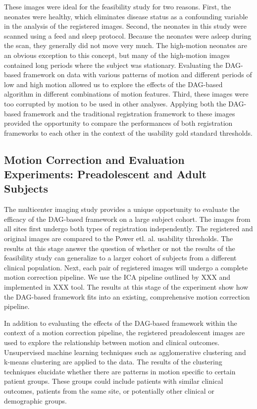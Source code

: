 These images were ideal for the feasibility study for two reasons. First, the neonates were healthy, which eliminates disease status as a confounding variable in the analysis of the registered images. Second, the neonates in this study were scanned using a feed and sleep protocol. Because the neonates were asleep during the scan, they generally did not move very much. The high-motion neonates are an obvious exception to this concept, but many of the high-motion images contained long periods where the subject was stationary. Evaluating the DAG-based framework on data with various patterns of motion and different periods of low and high motion allowed us to explore the effects of the DAG-based algorithm in different combinations of motion features. Third, these images were too corrupted by motion to be used in other analyses. Applying both the DAG-based framework and the traditional registration framework to these images provided the opportunity to compare the performances of both registration frameworks to each other in the context of the usability gold standard thresholds. 

\subsection{Motion Correction and Evaluation Experiments: Preadolescent and Adult Subjects}

The multicenter imaging study provides a unique opportunity to evaluate the efficacy of the DAG-based framework on a large subject cohort. The images from all sites first undergo both types of registration independently. The registered and original images are compared to the Power etl. al. usability thresholds. The results at this stage answer the question of whether or not the results of the feasibility study can generalize to a larger cohort of subjects from a different clinical population. Next, each pair of registered images will undergo a complete motion correction pipeline. We use the ICA pipeline outlined by XXX and implemented in XXX tool. The results at this stage of the experiment show how the DAG-based framework fits into an existing, comprehensive motion correction pipeline. 

In addition to evaluating the effects of the DAG-based framework within the context of a motion correction pipeline, the registered preadolescent images are used to explore the relationship between motion and clinical outcomes. Unsupervised machine learning techniques such as agglomerative clustering and k-means clustering are applied to the data. The results of the clustering techniques elucidate whether there are patterns in motion specific to certain patient groups. These groups could include patients with similar clinical outcomes, patients from the same site, or potentially other clinical or demographic groups.


